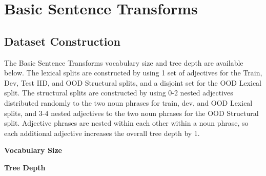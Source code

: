 \vskip 0.15in

\section{Basic Sentence Transforms}

\subsection{Dataset Construction} \label{sec:dtm-dataset-construction}
The Basic Sentence Transforms vocabulary size and tree depth are available below. The lexical splits are constructed by using 1 set of adjectives for the Train, Dev, Test IID, and OOD Structural splits, and a disjoint set for the OOD Lexical split. The structural splits are constructed by using 0-2 nested adjectives distributed randomly to the two noun phrases for train, dev, and OOD Lexical splits, and 3-4 nested adjectives to the two noun phrases for the OOD Structural split. Adjective phrases are nested within each other within a noun phrase, so each additional adjective increases the overall tree depth by 1.

\textbf{Vocabulary Size}
\begin{table}[H]
\begin{center}
\begin{sc}
\end{sc}
\end{center}
\vskip -0.1in
\end{table}

\textbf{Tree Depth}
\begin{table}[H]
\begin{center}
\begin{sc}
\end{sc}
\end{center}
\vskip -0.1in
\end{table}


